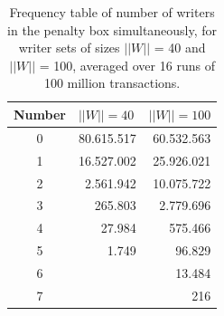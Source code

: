 \documentclass[10pt]{article}
\begin{document}

\begin{table}[htbp]
\centering
\begin{tabular}{@{}crr@{}}
\toprule
\multicolumn{1}{l}{Number} & \multicolumn{1}{l}{$||W||=40$} & \multicolumn{1}{l}{$||W||=100$} \\
\midrule
0  & 80.615.517      & 60.532.563                 \\
1  & 16.527.002      & 25.926.021                                 \\
2  & 2.561.942       & 10.075.722                                    \\
3  & 265.803       & 2.779.696                                 \\
4  & 27.984        & 575.466                                    \\
5  & 1.749        & 96.829                        \\
6                &   & 13.484                                     \\
7               &    & 216                                \\
\bottomrule
\end{tabular}
\caption{Frequency table of number of writers in the penalty box simultaneously, for writer sets of sizes $||W||$ = 40 and $||W||$ = 100, averaged over 16 runs of 100 million transactions.}
\label{table:freq_table}
\end{table}
\end{document}
